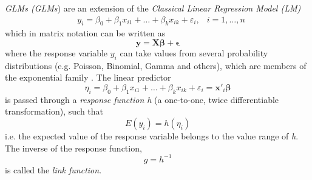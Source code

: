 \textit{\acl{GLM}s (\acs{GLM}s}) are an extension of the \textit{Classical Linear Regression Model (\acs{LM})}
$$
\begin{aligned}
&y_{i}=\beta_{0}+\beta_{1} x_{i 1}+\ldots+\beta_{k} x_{i k}+\varepsilon_{i}, &i=1, \ldots, n
\end{aligned}
$$
which in matrix notation can be written as
$$ \bm{y} = \bm{X}\bm{\beta} + \bm{\epsilon} $$
where the response variable $y_i$ can take values from several probability distributions (e.g. Poisson, Binomial, Gamma and others), which are members of the exponential family \cite{fahrmeir2003regression}. The linear predictor $$\eta_i = \beta_{0}+\beta_{1} x_{i 1}+\ldots+\beta_{k} x_{i k}+\varepsilon_{i} = \bm{x'}_i \bm{\beta}$$ 
is passed through a \textit{response function h} (a one-to-one, twice differentiable transformation), such that
$$ E(y_i) = h(\eta_i)$$
i.e. the expected value of the response variable belongs to the value range of \textit{h}. The inverse of the response function, 
$$g = h^{-1}$$ is called the \textit{link function}.




